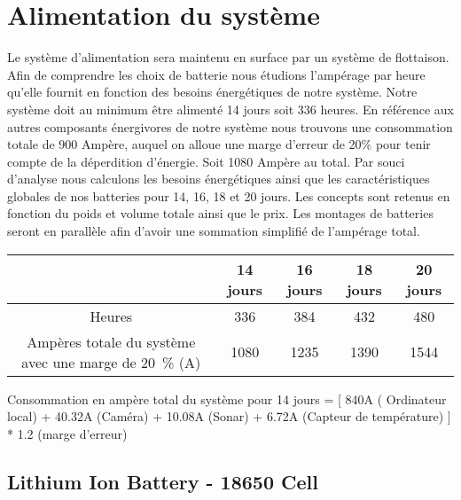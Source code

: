 \section{Alimentation du système}

	Le système d’alimentation sera maintenu en surface par un système de flottaison. Afin de comprendre les choix de batterie nous étudions l’ampérage par heure qu’elle fournit en fonction des besoins énergétiques de notre système. Notre système doit au minimum être alimenté 14 jours soit 336 heures. En référence aux autres composants énergivores de notre système nous trouvons une consommation totale de 900 Ampère, auquel on alloue une marge d’erreur de 20\% pour tenir compte de la déperdition d’énergie. Soit 1080 Ampère au total. Par souci d’analyse nous calculons les besoins énergétiques ainsi que les caractéristiques globales de nos batteries pour 14, 16, 18 et 20 jours. Les concepts sont retenus en fonction du poids et volume totale ainsi que le prix. Les montages de batteries seront en parallèle afin d’avoir une sommation simplifié de l’ampérage total.\\

\begin{table}[htp]
\begin{tabular}{|c|c|c|c|c|}
\hline
                                                                                                & 14 jours & 16 jours & 18 jours & 20 jours \\ \hline
Heures                                                                                          & 336      & 384      & 432      & 480      \\ \hline
Ampères totale du système avec une marge de 20~\% (A) & 1080     & 1235     & 1390     & 1544     \\ \hline
\end{tabular}
\end{table}
	
	
	Consommation en ampère total du système pour 14 jours = [ 840A ( Ordinateur local) + 40.32A (Caméra) + 10.08A (Sonar) + 6.72A (Capteur de température) ] * 1.2 (marge d’erreur)

	    \subsection{Lithium Ion Battery - 18650 Cell}
